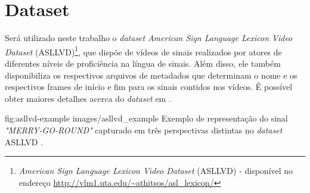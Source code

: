 \section{Dataset} %
\label{sec:dataset}
Será utilizado neste trabalho o \textit{dataset} \textit{American Sign Language Lexicon Video Dataset} (ASLLVD)\footnote{
    \textit{American Sign Language Lexicon Video Dataset} (ASLLVD) - disponível no endereço \url{http://vlm1.uta.edu/~athitsos/asl_lexicon/}
}, que dispõe de vídeos de sinais realizados por atores de diferentes níveis de proficiência na língua de sinais. Além disso, ele também disponibiliza os respectivos arquivos de metadados que determinam o nome e os respectivos frames de início e fim para os sinais contidos nos vídeos. É possível obter maiores detalhes acerca do \textit{dataset} em \cite{athitsos-asldataset-2008}.

\image
    {fig:asllvd-example}
    {images/asllvd_example}
    {Exemplo de representação do sinal \textit{"MERRY-GO-ROUND"} capturado em três perspectivas distintas no \textit{dataset} ASLLVD \cite{athitsos-asldataset-2008}.}

